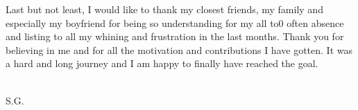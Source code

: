 Last but not least, I would like to thank my closest friends, my family and especially my boyfriend for being so understanding for my all to0 often absence and listing to all my whining and frustration in the last months. Thank you for believing in me and for all the motivation and contributions I have gotten. It was a hard and long journey and I am happy to finally have reached the goal. \\[2cm]


\begin{flushright}

\thesisdate \\[1pc]
S.G.\\[1pc]
\end{flushright}
